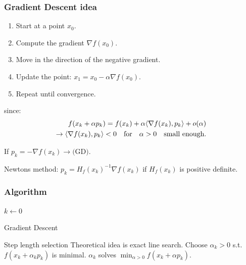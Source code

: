 \subsubsection*{Gradient Descent idea}
\begin{enumerate}
    \item Start at a point \( x_0 \).
    \item Compute the gradient \( \nabla f(x_0) \).
    \item Move in the direction of the negative gradient.
    \item Update the point: \( x_1 = x_0 - \alpha \nabla f(x_0) \).
    \item Repeat until convergence.
\end{enumerate}

since:
\begin{align*}
    f(x_k + \alpha p_k) = f(x_k) + \alpha \langle\nabla f(x_k), p_k\rangle + o(\alpha) \\
    \rightarrow \langle\nabla f(x_k), p_k\rangle < 0 \quad \text{for} \quad \alpha > 0 \quad \text{small enough}.
\end{align*}

\begin{example}{}{}
    If  \(p_k = - \nabla f(x_k) \rightarrow \text{(GD)}\).

    Newtons method:  \(p_k = H_f(x_k)^{-1} \nabla f(x_k)\) if  \(H_f(x_k)\) is positive definite.
\end{example}

\subsubsection*{Algorithm}
\begin{algorithm}[H]
\SetAlgoLined
{}
 \(k \gets 0\)\;
\;
\caption{Gradient Descent}
\end{algorithm}

\begin{remark}{Step length selection}{}
    Theoretical idea is exact line search. Choose  \(\alpha_k > 0\) s.t.  \(f(x_k + \alpha_k p_k)\) is minimal.
     \(\alpha_k\) solves  \(\min_{\alpha > 0} f(x_k + \alpha p_k)\).
\end{remark}


